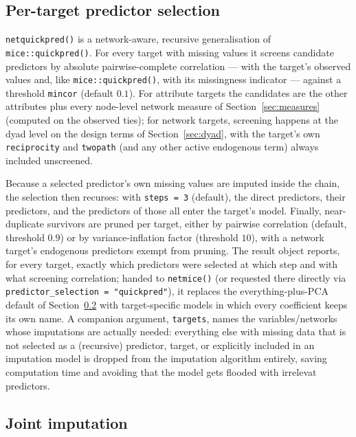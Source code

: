 \documentclass[11pt,a4paper]{article}
\newcommand{\code}[1]{\texttt{#1}}
\begin{document}
\subsection{Per-target predictor selection}
\label{sec:netquickpred}

\code{netquickpred()} is a network-aware, recursive generalisation of
\code{mice::quickpred()}. For every target with missing values it screens
candidate predictors by absolute pairwise-complete correlation --- with the
target's observed values and, like \code{mice::quickpred()}, with its missingness
indicator --- against a threshold \code{mincor} (default $0.1$). For
attribute targets the candidates are the other attributes plus every
node-level network measure of Section~\ref{sec:measures} (computed on the
observed ties); for network targets, screening happens at the dyad level on
the design terms of Section~\ref{sec:dyad}, with the target's own
\code{reciprocity} and \code{twopath} (and any other active endogenous
term) always included unscreened.

Because a
selected predictor's own missing values are imputed inside the chain, the
selection then recurses: with \code{steps = 3} (default), the direct
predictors, their predictors, and the predictors of those all enter the
target's model. Finally, near-duplicate survivors are pruned
per target, either by pairwise correlation (default, threshold $0.9$) or by
variance-inflation factor (threshold $10$), with a network target's
endogenous predictors exempt from pruning. The result
object reports, for every target, exactly which predictors were selected at
which step and with what screening correlation; handed to \code{netmice()}
(or requested there directly via \code{predictor\_selection =
"quickpred"}), it replaces the everything-plus-PCA default of
Section~\ref{sec:netmice} with target-specific models in which every
coefficient keeps its own name. A companion argument, \code{targets}, names
the variables/networks whose imputations are actually needed: everything
else with missing data that is not selected as a (recursive) predictor, target, or explicitly included in an imputation model is
dropped from the imputation algorithm entirely, saving computation time and avoiding that the model gets flooded with irrelevat predictors.

\subsection{Joint imputation}
\label{sec:netmice}
\end{document}
